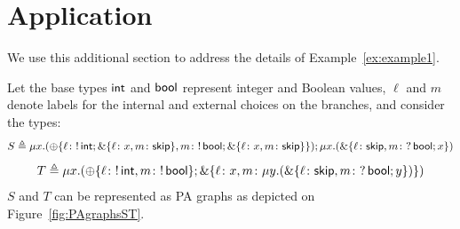 \appendix
\section{Application}
	
	We use this additional section to address the details of Example~\ref{ex:example1}.
	
\begin{example}
	Let the base types $\mathsf{int}$ and $\mathsf{bool}$ represent integer and Boolean values, $\ell$ and $m$ denote labels for the internal and external choices on the branches, and consider the types:
	\[
	S\triangleq \mu x. (\oplus\{\ell\colon !\,\mathsf{int}; \&\{\ell\colon x, m\colon \mathsf{skip} \} , m\colon !\, \mathsf{bool}; \&\{\ell\colon x, m\colon \mathsf{skip} \} \}); \mu x. (\&\{\ell\colon\mathsf{skip}, m\colon ?\,\mathsf{bool}; x \})
	\]
	\[
	T\triangleq \mu x. (\oplus\{\ell\colon !\,\mathsf{int} , m\colon !\, \mathsf{bool}\}; \&\{\ell\colon x, m\colon \mu y. (\&\{\ell\colon\mathsf{skip}, m\colon ?\,\mathsf{bool}; y \})\})
	\]
	$S$ and $T$ can be represented as PA graphs as depicted on Figure~\ref{fig:PAgraphsST}.
	

\end{example}
